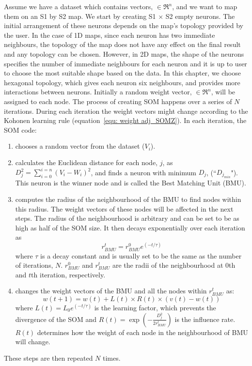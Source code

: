      Assume we have a dataset which contains vectors,  $\in \Re^n$, and we want to map them on an S1 by S2 map. 
     We start by creating S1 $\times$ S2 empty neurons. 
     The initial arrangement of these neurons depends on the map's topology provided by the user.
     In the case of 1D maps, since each neuron has two immediate neighbours, the topology of the map does not have any effect on the final result and any topology can be chosen.
     However, in 2D maps, the shape of the neurons specifies the number of immediate neighbours for each neuron and it is up to user to choose the most suitable shape based on the data.
     In this chapter, we choose hexagonal topology, which gives each neuron six neighbours, and provides more interactions between neurons.
     Initially a random weight vector,  $\in \Re^n$, will be assigned to each node.
     The process of creating SOM happens over a series of $N$ iterations. 
     During each iteration the weight vectors might change according to the Kohonen learning rule (equation~\ref{equ: weight adj_SOMZ}). 
      In each iteration, the SOM code:
     \begin{enumerate}
        \item chooses a random vector from the dataset ($V_i$).
        \item calculates the Euclidean distance for each node, $j$, as  $D_j^2= \sum_{i=0}^{i=n} (V_i - W_i)^2$, and finds a neuron with minimum $D_j$, (``$D_{j_{min}}$"). This neuron is the winner node and is called the Best Matching Unit (BMU). 
        \item  computes the radius of the neighbourhood of the BMU to find nodes within this radius. The weight vectors of these nodes will be affected in the next steps. The radius of the neighbourhood is arbitrary and can be set to be as high as half of the SOM size. It then decays exponentially over each iteration as
        \begin{equation}
            r^t_{BMU} = r^0_{BMU}e^{(-t/\tau)}
        \end{equation}
        where $\tau$ is a decay constant and is usually set to be the same as the number of iterations, $N$. $r^0_{BMU}$ and $r^t_{BMU}$ are the radii of the neighbourhood at 0th and $t$th iteration, respectively. 
        \item changes the weight vectors of the BMU and all the nodes within $r^t_{BMU}$ as:
        \begin{equation}
            \label{equ: weight adj_SOMZ}
            w(t+1)=w(t)+L(t) \times R(t) \times(v(t)-w(t))
        \end{equation}
        where $L(t) = L_0 e^{(-t/\tau)}$ is the learning factor, which prevents the divergence of the SOM and $R(t)=\exp(-\frac{D_j^2}{2r^t_{BMU}})$ is the influence rate. $R(t)$ determines how the weight of each node in the neighbourhood of BMU will change.
     \end{enumerate}
     These steps are then repeated $N$ times.
     
